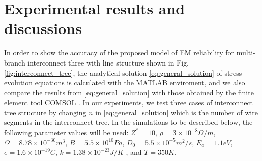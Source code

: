 \section{Experimental results and discussions}
\label{sec:experimental_results}
In order to show the accuracy of the proposed model of EM reliability for multi-branch interconnect three with line structure shown in Fig. \ref{fig:interconnect_tree}, the analytical solution \eqref{eq:general_solution} of stress evolution equations is calculated with the MATLAB enviroment, and we also compare the results from \eqref{eq:general_solution} with those obtained by the finite element tool COMSOL \cite{?}. In our experiments, we test three cases of interconnect tree structure by changing $n$ in \eqref{eq:general_solution} which is the number of wire segments in the interconnect tree. In the simulations to be described below, the following parameter values will be used: $Z^*=10$, $\rho=3\times10^{-8} \Omega/m$, $\Omega=8.78\times10^{-30}m^3$, $B=5.5\times10^{10} Pa$, $D_0=5.5\times10^{-5} m^2/s$, $E_a=1.1eV$, $e=1.6\times10^{-19}C$, $k=1.38\times10^{-23}J/K$ , and $T=350K$.

